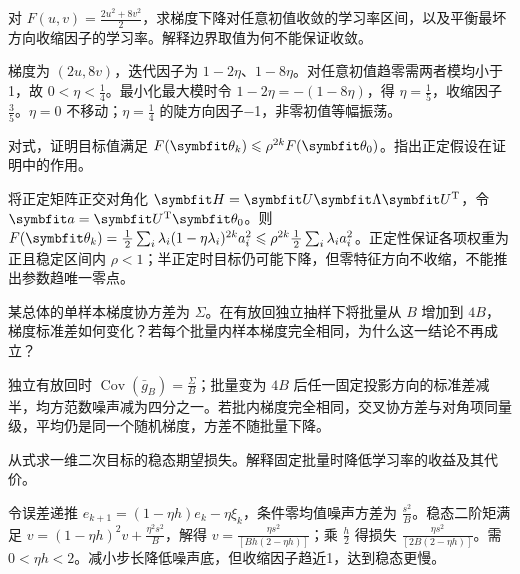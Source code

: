 
\begin{exercises}
\begin{exercise}\optional 对 $F(u,v)=\frac{2u^2+8v^2}{2}$，求梯度下降对任意初值收敛的学习率区间，以及平衡最坏方向收缩因子的学习率。解释边界取值为何不能保证收敛。

\begin{solution}
梯度为 $(2u,8v)$，迭代因子为 $1-2\eta$、$1-8\eta$。对任意初值趋零需两者模均小于1，故 $0<\eta<\frac{1}{4}$。最小化最大模时令 $1-2\eta=-(1-8\eta)$，得 $\eta=\frac{1}{5}$，收缩因子 $\frac{3}{5}$。$\eta=0$ 不移动；$\eta=\frac{1}{4}$ 的陡方向因子−1，非零初值等幅振荡。
\end{solution}
\end{exercise}

\begin{exercise}\optional 对式，证明目标值满足 $F(\vect{\theta}_k)\leq\rho^{2k}F(\vect{\theta}_0)$。指出正定假设在证明中的作用。

\begin{solution}
将正定矩阵正交对角化 $\mat{H}=\mat{U}\mat{\Lambda} \mat{U}^{\mathrm{T}}$，令 $\vect{a}=\mat{U}^{\mathrm{T}}\vect{\theta}_0$。则 $F(\vect{\theta}_k)=\frac12\sum_i\lambda_i(1-\eta\lambda_i)^{2k}a_i^2\le\rho^{2k}\frac12\sum_i\lambda_i a_i^2$。正定性保证各项权重为正且稳定区间内 $\rho<1$；半正定时目标仍可能下降，但零特征方向不收缩，不能推出参数趋唯一零点。
\end{solution}
\end{exercise}

\begin{exercise} 某总体的单样本梯度协方差为 $\Sigma$。在有放回独立抽样下将批量从 $B$ 增加到 $4B$，梯度标准差如何变化？若每个批量内样本梯度完全相同，为什么这一结论不再成立？

\begin{solution}
独立有放回时 $\operatorname{Cov}(\bar g_B)=\frac{\Sigma}{B}$；批量变为 $4B$ 后任一固定投影方向的标准差减半，均方范数噪声减为四分之一。若批内梯度完全相同，交叉协方差与对角项同量级，平均仍是同一个随机梯度，方差不随批量下降。
\end{solution}
\end{exercise}

\begin{exercise}\optional 从式求一维二次目标的稳态期望损失。解释固定批量时降低学习率的收益及其代价。

\begin{solution}
令误差递推 $e_{k+1}=(1-\eta h)e_k-\eta\xi_k$，条件零均值噪声方差为 $\frac{s^2}{B}$。稳态二阶矩满足 $v=(1-\eta h)^2v+\frac{\eta^2s^2}{B}$，解得 $v=\frac{\eta s^2}{[Bh(2-\eta h)]}$；乘 $\frac{h}{2}$ 得损失 $\frac{\eta s^2}{[2B(2-\eta h)]}$。需 $0<\eta h<2$。减小步长降低噪声底，但收缩因子趋近1，达到稳态更慢。
\end{solution}
\end{exercise}


\end{exercises}
